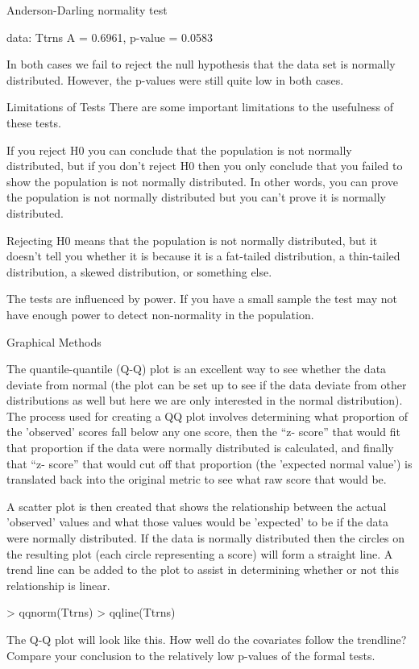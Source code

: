         Anderson-Darling normality test

data:  Ttrns 
A = 0.6961, p-value = 0.0583

In both cases we fail to reject the null hypothesis that the data set is normally distributed.
However, the p-values were still quite low in both cases.
 

Limitations of Tests
There are some important limitations to the usefulness of these tests.

If you reject H0 you can conclude that the population is not normally distributed, but if you don't reject H0 then you only conclude that you failed to show the population is not normally distributed. In other words, you can prove the population is not normally distributed but you can't prove it is normally distributed.

Rejecting H0 means that the population is not normally distributed, but it doesn't tell you whether it is because it is a fat-tailed distribution, a thin-tailed distribution, a skewed distribution, or something else. 

The tests are influenced by power. If you have a small sample the test may not have enough power to detect non-normality in the population.


Graphical Methods

The quantile-quantile (Q-Q) plot is an excellent way to see whether the data deviate from normal (the plot can be set up to see if the data deviate from other distributions as well but here we are only interested in the normal distribution). 
The process used for creating a QQ plot involves determining what proportion of the 'observed' scores fall below any one score, then the “z- score” that would fit that proportion if the data were normally distributed is calculated, and finally that “z- score” that would cut off that proportion (the 'expected normal value') is translated back into the original metric to see what raw score that would be. 

A scatter plot is then created that shows the relationship between the actual 'observed' values and what those values would be 'expected' to be if the data were normally distributed. 
If the data is normally distributed then the circles on the resulting plot (each circle representing a score) will form a straight line. 
A trend line can be added to the plot to assist in determining whether or not this relationship is linear.
 


> qqnorm(Ttrns)
> qqline(Ttrns)

The Q-Q plot will look like this. How well do the covariates follow the trendline? Compare your conclusion to the relatively low p-values of the formal tests.
  
